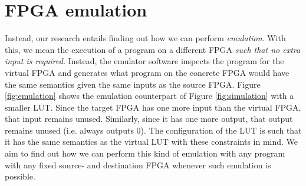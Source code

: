 \section{FPGA emulation}
Instead, our research entails finding out how we can perform \textit{emulation}. With this, we mean the execution of a program on a different FPGA \textit{such that no extra input is required.} Instead, the emulator software inspects the program for the virtual FPGA and generates what program on the concrete FPGA would have the same semantics given the same inputs as the source FPGA. Figure \ref{fig:emulation} shows the emulation counterpart of Figure \ref{fig:simulation} with a smaller LUT. Since the target FPGA has one more input than the virtual FPGA, that input remains unused. Similarly, since it has one more output, that output remains unused (i.e. always outputs 0). The configuration of the LUT is such that it has the same semantics as the virtual LUT with these constraints in mind. We aim to find out how we can perform this kind of emulation with any program with any fixed source- and destination FPGA whenever such emulation is possible.
